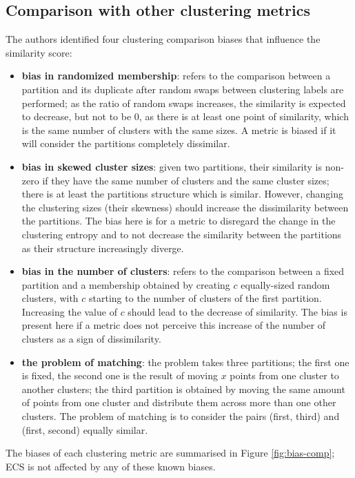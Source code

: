 \subsection{Comparison with other clustering metrics}
The authors identified four clustering comparison biases that influence the similarity score:
    \begin{itemize}
        \item \textbf{bias in randomized membership}: refers to the comparison between a partition and its duplicate after random swaps between clustering labels are performed; as the ratio of random swaps increases, the similarity is expected to decrease, but not to be 0, as there is at least one point of similarity, which is the same number of clusters with the same sizes. A metric is biased if it will consider the partitions completely dissimilar.
        \item \textbf{bias in skewed cluster sizes}: given two partitions, their similarity is non-zero if they have the same number of clusters and the same cluster sizes; there is at least the partitions structure which is similar. However, changing the clustering sizes (their skewness) should increase the dissimilarity between the partitions. The bias here is for a metric to disregard the change in the clustering entropy and to not decrease the similarity between the partitions as their structure increasingly diverge.
        \item \textbf{bias in the number of clusters}: refers to the comparison between a fixed partition and a membership obtained by creating $c$ equally-sized random clusters, with $c$ starting to the number of clusters of the first partition. Increasing the value of $c$ should lead to the decrease of similarity. The bias is present here if a metric does not perceive this increase of the number of clusters as a sign of dissimilarity.
        \item \textbf{the problem of matching}: the problem takes three partitions; the first one is fixed, the second one is the result of moving $x$ points from one cluster to another clusters; the third partition is obtained by moving the same amount of points from one cluster and distribute them across more than one other clusters. The problem of matching is to consider the pairs (first, third) and (first, second) equally similar.
    \end{itemize}
    
    The biases of each clustering metric are summarised in Figure \ref{fig:bias-comp}; ECS is not affected by any of these known biases.
    
